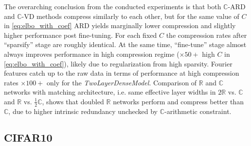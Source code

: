 \documentclass[a4paper,10pt,twocolumn]{article}
\newcommand{\real}{\mathbb{R}}
\newcommand{\cplx}{\mathbb{C}}
\begin{document}
The overarching conclusion from the conducted experiments is that both $\cplx$-ARD and
$\cplx$-VD methods compress similarly to each other, but for the same value of $C$ in
\eqref{eq:elbo_with_coef} ARD yields marginally lower compression and slightly higher
performance post fine-tuning. For each fixed $C$ the compression rates after ``sparsify''
stage are roughly identical.
%
%
At the same time, ``fine-tune'' stage almost always improves performance in high compression
regime ($\times50+$ high $C$ in \eqref{eq:elbo_with_coef}), likely due to regularization from
high sparsity.
Fourier features catch up to the raw data in terms of performance at high compression
rates $\times100+$ only for the \emph{TwoLayerDenseModel}.
%
Comparison of $\real$ and $\cplx$ networks with matching architecture, i.e. same effective
layer widths in $2\real$ vs. $\cplx$ and $\real$ vs. $\tfrac12\cplx$, shows that doubled
$\real$ networks perform and compress better than $\cplx$, due to higher intrinsic redundancy
unchecked by $\cplx$-arithmetic constraint.



\subsection{CIFAR10} %
\label{sub:cifar10}
\end{document}
